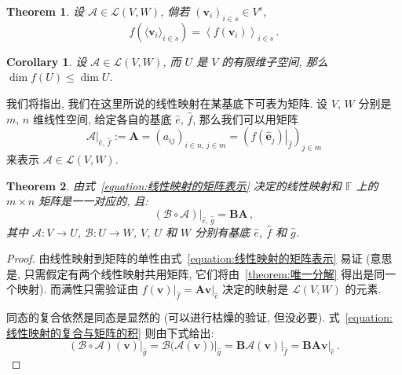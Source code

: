 \documentclass[openany]{ctexbook}
\theoremstyle{plain}
\newtheorem{theorem}{Theorem}[section] %
\newtheorem{corollary}{Corollary} %
\theoremstyle{definition}
\newcommand*{\basis}[1]{\hat{\boldsymbol{#1}}} %
\newcommand*{\bv}{\boldsymbol} %
\newcommand*{\inbasis}[2]{\left.%
	{#1}\right|_{#2}
}
\begin{document}
\begin{theorem}
	设 $\mathscr A \in \mathcal L (V, W)$, 倘若 $(\bv v_i)_{i \in s} \in V^s$, 
	\begin{equation*}
		f \left( 
			\langle \bv v_i \rangle_{i \in s}
		\right) = \left\langle
			f(\bv v_i)
		\right\rangle_{i \in s}\,.
	\end{equation*} 
\end{theorem}

\begin{corollary}
	设 $\mathscr A \in \mathcal L (V, W)$, 而 $U$ 是 $V$ 的有限维子空间, 那么 $\dim f(U) \leq \dim U$.
\end{corollary}

我们将指出, 我们在这里所说的线性映射在某基底下可表为矩阵. 
设 $V$, $W$ 分别是 $m$, $n$ 维线性空间, 给定各自的基底 $\hat e$, $\hat f$, 那么我们可以用矩阵
\begin{equation}\label{equation:线性映射的矩阵表示}
	\inbasis{\mathscr A}{\hat e,\, \hat f} 
		:= \bv A = (a_{ij})_{i \in n,\, j \in m}
		= \left( 
			\inbasis{f(\basis e_j)}{\hat f}
		 \right)_{j \in m}
\end{equation}
来表示 $\mathscr A \in \mathcal L (V, W)$. 

\begin{theorem}
	由式~\eqref{equation:线性映射的矩阵表示} 决定的线性映射和 $\mathbb F$ 上的 $m \times n$ 矩阵是一一对应的, 且:
	\begin{equation}\label{equation:线性映射的复合与矩阵的积}
		\inbasis{(\mathscr B \circ \mathscr A)}{\hat e,\, \hat g} = \bv B \bv A\,,
	\end{equation}
	其中 $\mathscr A \colon V \to U$, $\mathscr B \colon U \to W$, $V$, $U$ 和 $W$ 分别有基底 $\hat e$, $\hat f$ 和 $\hat g$.
\end{theorem}
\begin{proof}
	由线性映射到矩阵的单性由式~\eqref{equation:线性映射的矩阵表示} 易证 (意思是, 只需假定有两个线性映射共用矩阵, 它们将由~\ref{theorem:唯一分解} 得出是同一个映射). 而满性只需验证由 $\inbasis{f(\bv v)}{\hat f} = \bv A \inbasis{\bv v}{\hat e}$ 决定的映射是 $\mathcal L(V, W)$ 的元素.

	同态的复合依然是同态是显然的 (可以进行枯燥的验证, 但没必要). 
	式~\eqref{equation:线性映射的复合与矩阵的积} 则由下式给出:
	\begin{equation*}
		\inbasis{(\mathscr B \circ \mathscr A)(\bv v)}{\hat g} 
		= \inbasis{\mathscr B \big(
			\mathscr A(\bv v)\big)}{\hat g}
		= \bv B \inbasis{\mathscr A(\bv v)}{\hat f}
		= \bv B \bv A \inbasis{\bv v}{\hat e}\,.
	\end{equation*}
\end{proof}
\end{document}
